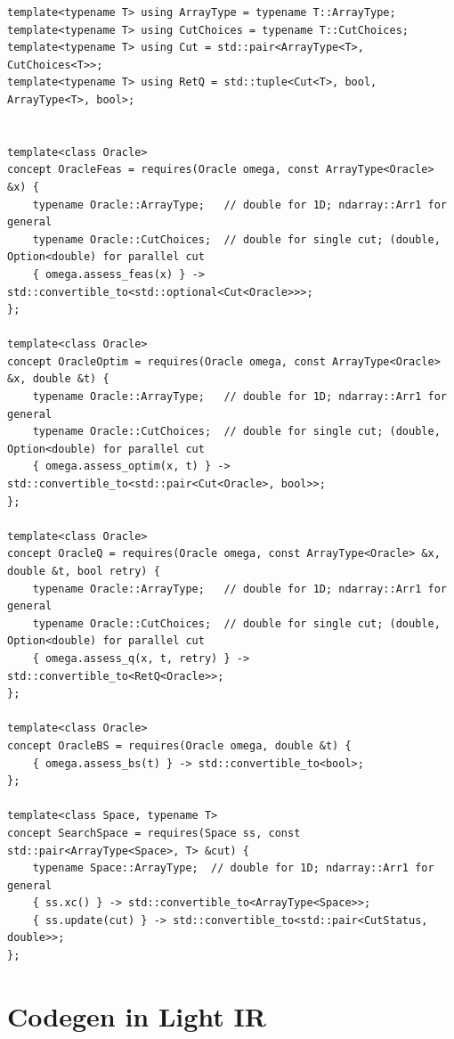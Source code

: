 \documentclass[a4paper]{exam}
\theoremstyle{definition}
\begin{document}
\begin{verbatim}
template<typename T> using ArrayType = typename T::ArrayType;
template<typename T> using CutChoices = typename T::CutChoices;
template<typename T> using Cut = std::pair<ArrayType<T>, CutChoices<T>>;
template<typename T> using RetQ = std::tuple<Cut<T>, bool, ArrayType<T>, bool>;


template<class Oracle>
concept OracleFeas = requires(Oracle omega, const ArrayType<Oracle> &x) {
    typename Oracle::ArrayType;   // double for 1D; ndarray::Arr1 for general
    typename Oracle::CutChoices;  // double for single cut; (double, Option<double) for parallel cut
    { omega.assess_feas(x) } -> std::convertible_to<std::optional<Cut<Oracle>>>;
};

template<class Oracle>
concept OracleOptim = requires(Oracle omega, const ArrayType<Oracle> &x, double &t) {
    typename Oracle::ArrayType;   // double for 1D; ndarray::Arr1 for general
    typename Oracle::CutChoices;  // double for single cut; (double, Option<double) for parallel cut
    { omega.assess_optim(x, t) } -> std::convertible_to<std::pair<Cut<Oracle>, bool>>;
};

template<class Oracle>
concept OracleQ = requires(Oracle omega, const ArrayType<Oracle> &x, double &t, bool retry) {
    typename Oracle::ArrayType;   // double for 1D; ndarray::Arr1 for general
    typename Oracle::CutChoices;  // double for single cut; (double, Option<double) for parallel cut
    { omega.assess_q(x, t, retry) } -> std::convertible_to<RetQ<Oracle>>;
};

template<class Oracle>
concept OracleBS = requires(Oracle omega, double &t) {
    { omega.assess_bs(t) } -> std::convertible_to<bool>;
};

template<class Space, typename T>
concept SearchSpace = requires(Space ss, const std::pair<ArrayType<Space>, T> &cut) {
    typename Space::ArrayType;  // double for 1D; ndarray::Arr1 for general
    { ss.xc() } -> std::convertible_to<ArrayType<Space>>;
    { ss.update(cut) } -> std::convertible_to<std::pair<CutStatus, double>>;
};
\end{verbatim}

\section{Codegen in Light IR}

\printbibliography
\end{document}

